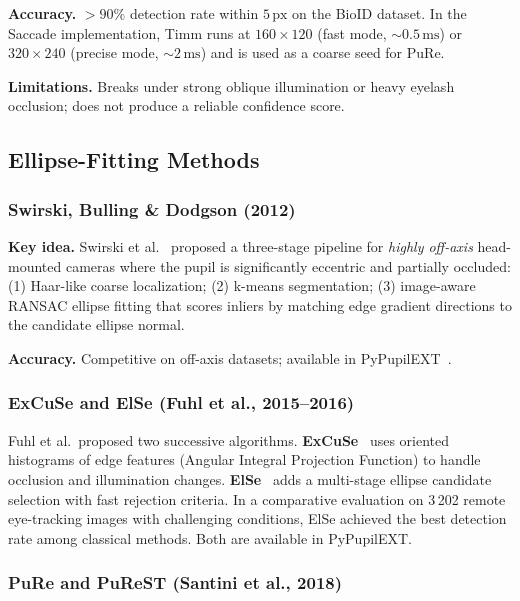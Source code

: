 \documentclass[11pt,a4paper]{article}
\begin{document}
\textbf{Accuracy.} $>90\%$ detection rate within $5\,\text{px}$ on the BioID dataset.
In the Saccade implementation, Timm runs at $160\times120$ (fast mode, ${\sim}0.5\,\text{ms}$) or $320\times240$ (precise mode, ${\sim}2\,\text{ms}$) and is used as a coarse seed for PuRe.

\textbf{Limitations.} Breaks under strong oblique illumination or heavy eyelash occlusion; does not produce a reliable confidence score.

\subsection{Ellipse-Fitting Methods}

\subsubsection{Swirski, Bulling \& Dodgson (2012)}

\textbf{Key idea.} Swirski et al.~\cite{swirski2012robust} proposed a three-stage pipeline for \textit{highly off-axis} head-mounted cameras where the pupil is significantly eccentric and partially occluded:
(1) Haar-like coarse localization;
(2) k-means segmentation;
(3) image-aware RANSAC ellipse fitting that scores inliers by matching edge gradient directions to the candidate ellipse normal.

\textbf{Accuracy.} Competitive on off-axis datasets; available in PyPupilEXT~\cite{pypupilext}.

\subsubsection{ExCuSe and ElSe (Fuhl et al., 2015--2016)}

Fuhl et al.\ proposed two successive algorithms.
\textbf{ExCuSe}~\cite{fuhl2015excuse} uses oriented histograms of edge features (Angular Integral Projection Function) to handle occlusion and illumination changes.
\textbf{ElSe}~\cite{fuhl2016else} adds a multi-stage ellipse candidate selection with fast rejection criteria.
In a comparative evaluation on 3\,202 remote eye-tracking images with challenging conditions, ElSe achieved the best detection rate among classical methods.
Both are available in PyPupilEXT.

\subsubsection{PuRe and PuReST (Santini et al., 2018)}
\end{document}
